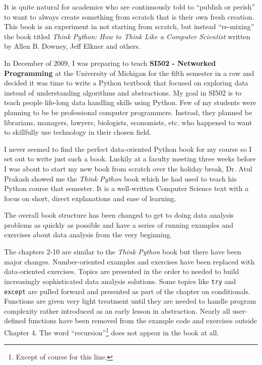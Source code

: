 \documentclass[11pt]{book}
\begin{document}
It is quite natural for academics who are continuously told to 
``publish or perish'' to want to always create something from scratch
that is their own fresh creation.   This book is an 
experiment in not starting from scratch, but instead ``re-mixing''
the book titled
\emph{Think Python: How to Think Like
a Computer Scientist}
written by Allen B. Downey, Jeff Elkner and others.

In December of 2009, I was preparing to teach
{\bf SI502 - Networked Programming} at the University of Michigan
for the fifth semester in a row and decided it was time
to write a Python textbook that focused on exploring data
instead of understanding algorithms and abstractions.
My goal in SI502 is to teach people life-long data handling 
skills using Python.  Few of my
students were planning to be be professional 
computer programmers.  Instead, they
planned be librarians, managers, lawyers, biologists, economists, etc. 
who happened to want to skillfully use technology in their chosen field.

I never seemed to find the perfect data-oriented Python
book for my course so I set out 
to write just such a book.  Luckily at a faculty meeting three weeks
before I was about to start my new book from scratch over 
the holiday break, 
Dr. Atul Prakash showed me the \emph{Think Python} book which he had
used to teach his Python course that semester.  
It is a well-written Computer Science text with a focus on 
short, direct explanations and ease of learning.  

The overall book structure
has been changed to get to doing data analysis problems as quickly as
possible and have a series of running examples and exercises 
about data analysis from the very beginning.  

The chapters 2-10 are similar to the \emph{Think Python} book
but there have been major changes.  Number-oriented examples and
exercises have been replaced with data-oriented exercises.
Topics are presented in the order to needed to build increasingly
sophisticated data analysis solutions.  Some topics like {\tt try} and
{\tt except} are pulled forward and presented as part of the chapter
on conditionals.  Functions are given very light treatment until 
they are needed to handle program complexity rather introduced 
as an early lesson in abstraction.  Nearly all user-defined functions
have been removed from the example code and exercises outside Chapter 4.
The word ``recursion''\footnote{Except of course for this line.}
does not appear in the book at all.
\end{document}
